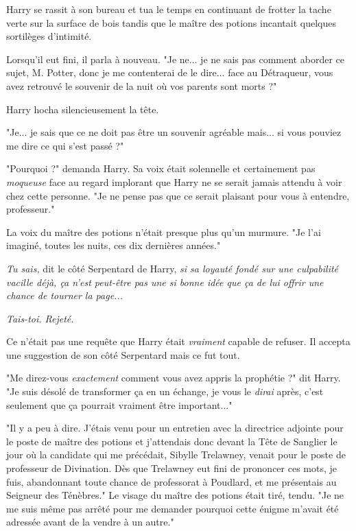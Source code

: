 Harry se rassit à son bureau et tua le temps en continuant de frotter la tache verte sur la surface de bois tandis que le maître des potions incantait quelques sortilèges d'intimité.

Lorsqu'il eut fini, il parla à nouveau. "Je ne... je ne sais pas comment aborder ce sujet, M. Potter, donc je me contenterai de le dire... face au Détraqueur, vous avez retrouvé le souvenir de la nuit où vos parents sont morts ?"

Harry hocha silencieusement la tête.

"Je... je sais que ce ne doit pas être un souvenir agréable mais... si vous pouviez me dire ce qui s'est passé ?"

"Pourquoi ?" demanda Harry. Sa voix était solennelle et certainement pas \emph{moqueuse}  face au regard implorant que Harry ne se serait jamais attendu à voir chez cette personne. "Je ne pense pas que ce serait plaisant pour vous à entendre, professeur."

La voix du maître des potions n'était presque plus qu'un murmure. "Je l'ai imaginé, toutes les nuits, ces dix dernières années."

\emph{Tu sais, } dit le côté Serpentard de Harry, \emph{si sa loyauté fondé sur une culpabilité vacille déjà, ça n'est peut-être pas une si bonne idée que ça de lui offrir une chance de tourner la page...} 

\emph{Tais-toi. Rejeté.} 

Ce n'était pas une requête que Harry était \emph{vraiment}  capable de refuser. Il accepta une suggestion de son côté Serpentard mais ce fut tout.

"Me direz-vous \emph{exactement}  comment vous avez appris la prophétie ?" dit Harry. "Je suis désolé de transformer ça en un échange, je vous le \emph{dirai}  après, c'est seulement que ça pourrait vraiment être important..."

"Il y a peu à dire. J'étais venu pour un entretien avec la directrice adjointe pour le poste de maître des potions et j'attendais donc devant la Tête de Sanglier le jour où la candidate qui me précédait, Sibylle Trelawney, venait pour le poste de professeur de Divination. Dès que Trelawney eut fini de prononcer ces mots, je fuis, abandonnant toute chance de professorat à Poudlard, et me présentais au Seigneur des Ténèbres." Le visage du maître des potions était tiré, tendu. "Je ne me suis même pas arrêté pour me demander pourquoi cette énigme m'avait été adressée avant de la vendre à un autre."

